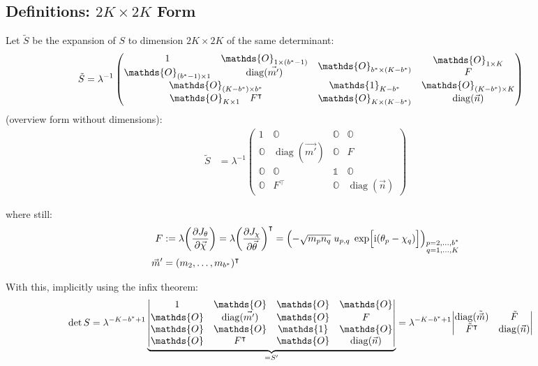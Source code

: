 \documentclass[
	english,
	a4paper,
	fontsize=10pt,
	parskip=half,
	titlepage=true,
	DIV=12,
	final
]{scrreprt}
\newcommand*{\transp}{\ensuremath{^\intercal}}
\newcommand*{\iunit}{\ensuremath{\mathrm{i}}}
\DeclareMathOperator{\diag}{diag}
\begin{document}
\subsection{Definitions: $2K \times 2K$ Form}
Let $\tilde{S}$ be the expansion of $S$ to dimension $2K \times 2K$ of the same determinant:
\begin{align}
	\tilde{S}
&=
	\lambda^{-1}
	\begin{pmatrix}
		\mqty{	1 & \mathds{O}_{1 \times (b^* - 1)} \\ 
				\mathds{O}_{(b^* - 1) \times 1} & \diag(\vec{m'})} &
		\mathds{O}_{b^* \times (K - b^*)}	& 
		\mqty{\mathds{O}_{1 \times K} \\ F}
	\\
		\mathds{O}_{(K - b^*) \times b^*}  &  \mathds{1}_{K - b^*}  &  \mathds{O}_{(K - b^*) \times K}
	\\
		\mqty{\mathds{O}_{K \times 1} & F\transp} & 
		\mathds{O}_{K \times (K - b^*)} & \diag(\vec{n})
	\end{pmatrix}
\end{align}
(overview form without dimensions):
\begin{align}
	\tilde{S}
&=
	\lambda^{-1}
	\begin{pmatrix}
		1			& \mathds{O} 		& \mathds{O}		& \mathds{O} \\
		\mathds{O}	& \diag(\vec{m'})	& \mathds{O}		& F          \\
		\mathds{O}	& \mathds{O}			& \mathds{1}		& \mathds{O} \\
		\mathds{O}	& F\transp			& \mathds{O}		& \diag(\vec{n})
	\end{pmatrix}
\end{align}

where still:
\begin{align}
	F
&:=
	\lambda \qty( \pdv{J_{\theta}}{\vec{\chi}} ) 
	= \lambda \qty( \pdv{J_{\chi}}{\vec{\theta}} )\transp
	= \qty( -\sqrt{m_p n_q} \; u_{p,q} \; \exp[\Big. \iunit(\theta_p - \chi_q)] )_{
		\substack{p = 2, \ldots, b^* \\ q = 1, \ldots, K}
	}
\label{eqn:DefDetOffDiagonalF_m}
\\
	\vec{m}'
&=
	(m_2, \ldots, m_{b^*})\transp
\end{align}

With this, implicitly using the infix theorem:
\begin{align}
	\det S
&=
	\lambda^{-K - b^* + 1}
	\underbrace{\mqty|
		1			& \mathds{O} 		& \mathds{O}		& \mathds{O} \\
		\mathds{O}	& \diag(\vec{m'})	& \mathds{O}		& F          \\
		\mathds{O}	& \mathds{O}			& \mathds{1}		& \mathds{O} \\
		\mathds{O}	& F\transp			& \mathds{O}		& \diag(\vec{n})
	|}_{= S'}
=
	\lambda^{-K - b^* + 1}
	\mqty|
		\diag(\tilde{\vec{m}})	& \tilde{F}			\\
		\tilde{F}\transp			& \diag(\vec{n})
	|
\label{eqn:detS_protoform_m}
\end{align}
\end{document}
